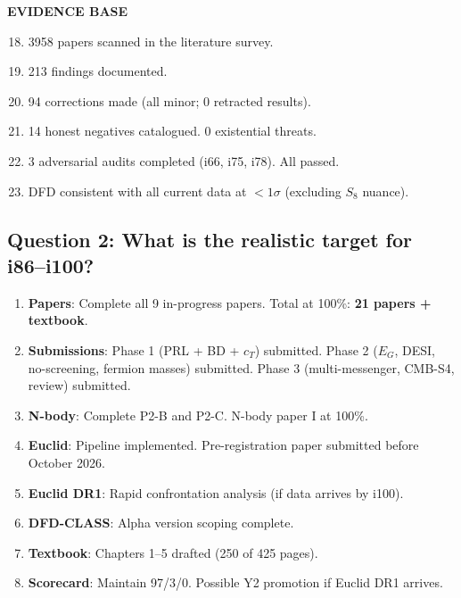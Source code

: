 \documentclass[11pt,a4paper]{article}
\begin{document}
\begin{tcolorbox}[colback=blue!5!white, colframe=dfdblue, title=\textbf{Programme Achievements: i1--i85}]
\textbf{EVIDENCE BASE}
\begin{enumerate}[nosep]
\setcounter{enumi}{17}
\item 3958 papers scanned in the literature survey.
\item 213 findings documented.
\item 94 corrections made (all minor; 0 retracted results).
\item 14 honest negatives catalogued. 0 existential threats.
\item 3 adversarial audits completed (i66, i75, i78). All passed.
\item DFD consistent with all current data at $< 1\sigma$ (excluding $S_8$ nuance).
\end{enumerate}
\end{tcolorbox}

\subsection{Question 2: What is the realistic target for i86--i100?}

\begin{tcolorbox}[colback=blue!5!white, colframe=dfdblue, title=\textbf{i86--i100 Realistic Targets}]
\begin{enumerate}[nosep]
\item \textbf{Papers}: Complete all 9 in-progress papers. Total at 100\%: \textbf{21 papers + textbook}.
\item \textbf{Submissions}: Phase 1 (PRL + BD + $c_T$) submitted. Phase 2 ($E_G$, DESI, no-screening, fermion masses) submitted. Phase 3 (multi-messenger, CMB-S4, review) submitted.
\item \textbf{N-body}: Complete P2-B and P2-C. N-body paper I at 100\%.
\item \textbf{Euclid}: Pipeline implemented. Pre-registration paper submitted before October 2026.
\item \textbf{Euclid DR1}: Rapid confrontation analysis (if data arrives by i100).
\item \textbf{DFD-CLASS}: Alpha version scoping complete.
\item \textbf{Textbook}: Chapters 1--5 drafted (250 of 425 pages).
\item \textbf{Scorecard}: Maintain 97/3/0. Possible Y2 promotion if Euclid DR1 arrives.
\end{enumerate}
\end{tcolorbox}
\end{document}
